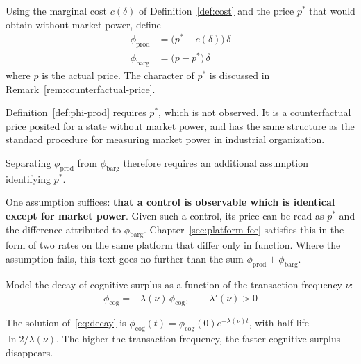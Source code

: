 \begin{definition}
\label{def:phi-prod}
Using the marginal cost $c(\delta)$ of Definition~\ref{def:cost} and the price $p^{\ast}$
that would obtain without market power, define
\begin{align}
\phi_{\mathrm{prod}} &= \bigl(p^{\ast} - c(\delta)\bigr)\,\delta \\
\phi_{\mathrm{barg}} &= \bigl(p - p^{\ast}\bigr)\,\delta
\end{align}
where $p$ is the actual price. The character of $p^{\ast}$ is discussed in
Remark~\ref{rem:counterfactual-price}.
\end{definition}

\begin{remark}
\label{rem:counterfactual-price}
Definition~\ref{def:phi-prod} requires $p^{\ast}$, which is not observed. It is a
counterfactual price posited for a state without market power, and has the same structure as
the standard procedure for measuring market power in industrial organization.

Separating $\phi_{\mathrm{prod}}$ from $\phi_{\mathrm{barg}}$ therefore requires an
additional assumption identifying $p^{\ast}$.

One assumption suffices: \textbf{that a control is observable which is identical except for
market power}. Given such a control, its price can be read as $p^{\ast}$ and the difference
attributed to $\phi_{\mathrm{barg}}$. Chapter~\ref{sec:platform-fee} satisfies this in the
form of two rates on the same platform that differ only in function. Where the assumption
fails, this text goes no further than the sum
$\phi_{\mathrm{prod}}+\phi_{\mathrm{barg}}$.
\end{remark}

Model the decay of cognitive surplus as a function of the transaction frequency $\nu$:
\begin{equation}
\dot{\phi}_{\mathrm{cog}} = -\lambda(\nu)\,\phi_{\mathrm{cog}},
\qquad \lambda'(\nu)>0
\label{eq:decay}
\end{equation}

\begin{proposition}
The solution of~\eqref{eq:decay} is
$\phi_{\mathrm{cog}}(t)=\phi_{\mathrm{cog}}(0)e^{-\lambda(\nu)t}$, with half-life
$\ln 2/\lambda(\nu)$. The higher the transaction frequency, the faster cognitive surplus
disappears.
\end{proposition}


